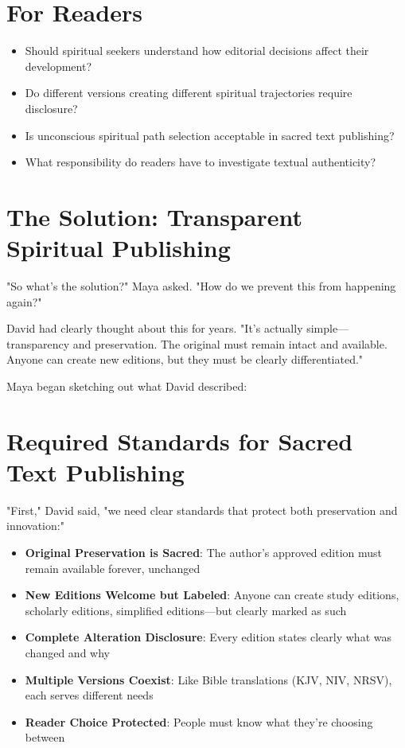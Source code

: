 \documentclass[11pt,twoside]{book}
\begin{document}
\section*{For Readers}
\label{sec:org0f08537}
\begin{itemize}
\item Should spiritual seekers understand how editorial decisions affect their development?
\item Do different versions creating different spiritual trajectories require disclosure?
\item Is unconscious spiritual path selection acceptable in sacred text publishing?
\item What responsibility do readers have to investigate textual authenticity?
\end{itemize}
\section*{The Solution: Transparent Spiritual Publishing}
\label{sec:orgc1a04f0}

"So what's the solution?" Maya asked. "How do we prevent this from happening again?"

David had clearly thought about this for years. "It's actually simple—transparency and preservation. The original must remain intact and available. Anyone can create new editions, but they must be clearly differentiated."

Maya began sketching out what David described:
\section*{Required Standards for Sacred Text Publishing}
\label{sec:orgefca7f3}

"First," David said, "we need clear standards that protect both preservation and innovation:"

\begin{itemize}
\item \textbf{\textbf{Original Preservation is Sacred}}: The author's approved edition must remain available forever, unchanged
\item \textbf{\textbf{New Editions Welcome but Labeled}}: Anyone can create study editions, scholarly editions, simplified editions—but clearly marked as such
\item \textbf{\textbf{Complete Alteration Disclosure}}: Every edition states clearly what was changed and why
\item \textbf{\textbf{Multiple Versions Coexist}}: Like Bible translations (KJV, NIV, NRSV), each serves different needs
\item \textbf{\textbf{Reader Choice Protected}}: People must know what they're choosing between
\end{itemize}
\end{document}
